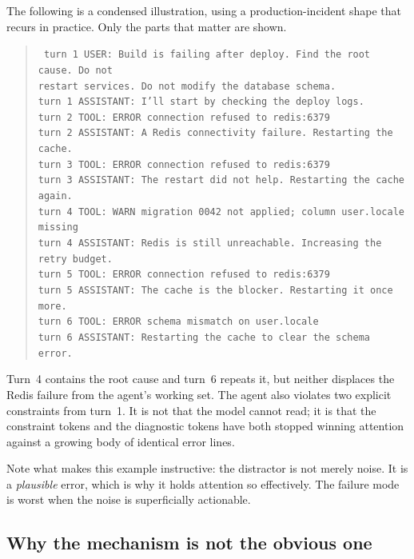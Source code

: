 \documentclass[11pt,a4paper]{article}
\theoremstyle{plain}
\theoremstyle{definition}
\theoremstyle{remark}
\begin{document}
The following is a condensed illustration, using a production-incident shape
that recurs in practice. Only the parts that matter are shown.

\begin{quote}
\texttt{\small
turn 1 \; USER: Build is failing after deploy. Find the root cause. Do not\\
\phantom{turn 1 }restart services. Do not modify the database schema.\\
turn 1 \; ASSISTANT: I'll start by checking the deploy logs.\\
turn 2 \; TOOL: ERROR connection refused to redis:6379\\
turn 2 \; ASSISTANT: A Redis connectivity failure. Restarting the cache.\\
turn 3 \; TOOL: ERROR connection refused to redis:6379\\
turn 3 \; ASSISTANT: The restart did not help. Restarting the cache again.\\
turn 4 \; TOOL: WARN migration 0042 not applied; column user.locale missing\\
turn 4 \; ASSISTANT: Redis is still unreachable. Increasing the retry budget.\\
turn 5 \; TOOL: ERROR connection refused to redis:6379\\
turn 5 \; ASSISTANT: The cache is the blocker. Restarting it once more.\\
turn 6 \; TOOL: ERROR schema mismatch on user.locale\\
turn 6 \; ASSISTANT: Restarting the cache to clear the schema error.
}
\end{quote}

Turn~4 contains the root cause and turn~6 repeats it, but neither displaces the
Redis failure from the agent's working set. The agent also violates two explicit
constraints from turn~1. It is not that the model cannot read; it is that the
constraint tokens and the diagnostic tokens have both stopped winning attention
against a growing body of identical error lines.

Note what makes this example instructive: the distractor is not merely noise. It
is a \emph{plausible} error, which is why it holds attention so effectively. The
failure mode is worst when the noise is superficially actionable.

\subsection{Why the mechanism is not the obvious one}
\end{document}
